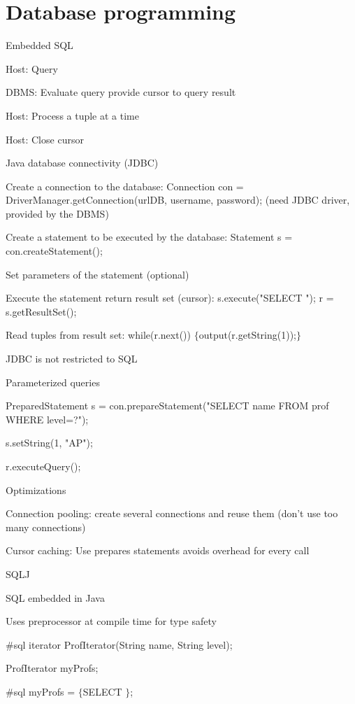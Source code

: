\section{Database programming}
\enumstart
	\item Embedded SQL
	\enumstart
		\item Host: Query
		\item DBMS: Evaluate query \arrow provide cursor to query result
		\item Host: Process a tuple at a time
		\item Host: Close cursor
	\enumend
	\item Java database connectivity (JDBC)
	\enumstart
		\item Create a connection to the database: Connection con = DriverManager.getConnection(urlDB, username, password); (need JDBC driver, provided by the DBMS)
		\item Create a statement to be executed by the database: Statement s = con.createStatement();
		\item Set parameters of the statement (optional)
		\item Execute the statement \arrow return result set (cursor): s.execute("SELECT \ddd"); r = s.getResultSet();
		\item Read tuples from result set: while(r.next()) $\{$output(r.getString(1));$\}$
		\item JDBC is not restricted to SQL
	\enumend
	\item Parameterized queries
	\enumstart
		\item PreparedStatement s = con.prepareStatement("SELECT name FROM prof WHERE level=?");
		\item s.setString(1, "AP");
		\item r.executeQuery();
	\enumend
	\item Optimizations
	\enumstart
		\item Connection pooling: create several connections and reuse them (don't use too many connections)
		\item Cursor caching: Use prepares statements \arrow avoids overhead for every call
	\enumend
	\item SQLJ
	\enumstart
		\item SQL embedded in Java
		\item Uses preprocessor at compile time for type safety
		\item \#sql iterator ProfIterator(String name, String level);
		\item ProfIterator myProfs;
		\item \#sql myProfs = $\{$SELECT \ddd$\}$;
